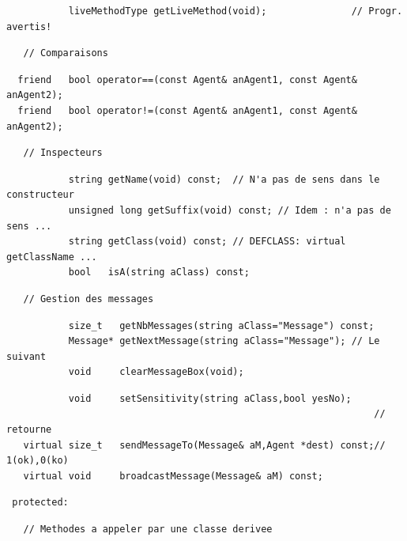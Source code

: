 \documentclass[12pt]{article}
\begin{document}
\begin{footnotesize}
\begin{verbatim}
           liveMethodType getLiveMethod(void);               // Progr. avertis!
\end{verbatim}
\vspace{-0.5cm}
\begin{verbatim}
   // Comparaisons
\end{verbatim}
\vspace{-0.5cm}
\begin{verbatim}
  friend   bool operator==(const Agent& anAgent1, const Agent& anAgent2);
  friend   bool operator!=(const Agent& anAgent1, const Agent& anAgent2);
\end{verbatim}
\vspace{-0.5cm}
\begin{verbatim}
   // Inspecteurs
\end{verbatim}
\vspace{-0.5cm}
\begin{verbatim}
           string getName(void) const;  // N'a pas de sens dans le constructeur 
           unsigned long getSuffix(void) const; // Idem : n'a pas de sens ...
           string getClass(void) const; // DEFCLASS: virtual getClassName ... 
           bool   isA(string aClass) const;
\end{verbatim}
\vspace{-0.5cm}
\begin{verbatim}
   // Gestion des messages
\end{verbatim}
\vspace{-0.5cm}
\begin{verbatim}
           size_t   getNbMessages(string aClass="Message") const;
           Message* getNextMessage(string aClass="Message"); // Le suivant
           void     clearMessageBox(void);
\end{verbatim}
\vspace{-0.5cm}
\begin{verbatim}
           void     setSensitivity(string aClass,bool yesNo);
                                                                 // retourne
   virtual size_t   sendMessageTo(Message& aM,Agent *dest) const;// 1(ok),0(ko)
   virtual void     broadcastMessage(Message& aM) const;
\end{verbatim}
\vspace{-0.5cm}
\begin{verbatim}
 protected:
\end{verbatim}
\vspace{-0.5cm}
\begin{verbatim}
   // Methodes a appeler par une classe derivee

\end{verbatim}
\end{footnotesize}
\end{document}
